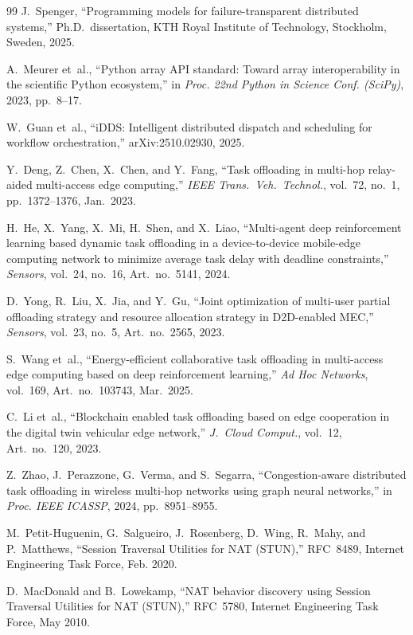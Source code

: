 {\begin{thebibliography}{99}
J.~Spenger,
``Programming models for failure-transparent distributed systems,''
Ph.D.\ dissertation, KTH Royal Institute of Technology, Stockholm, Sweden, 2025.

A.~Meurer et~al.,
``Python array API standard: Toward array interoperability in the scientific Python ecosystem,''
in \textit{Proc. 22nd Python in Science Conf. (SciPy)}, 2023, pp.~8--17.

W.~Guan et~al.,
``iDDS: Intelligent distributed dispatch and scheduling for workflow orchestration,''
arXiv:2510.02930, 2025.

Y.~Deng, Z.~Chen, X.~Chen, and Y.~Fang,
``Task offloading in multi-hop relay-aided multi-access edge computing,''
\textit{IEEE Trans.\ Veh.\ Technol.}, vol.~72, no.~1, pp.~1372--1376, Jan.\ 2023.

H.~He, X.~Yang, X.~Mi, H.~Shen, and X.~Liao,
``Multi-agent deep reinforcement learning based dynamic task offloading in a device-to-device mobile-edge computing network to minimize average task delay with deadline constraints,''
\textit{Sensors}, vol.~24, no.~16, Art.~no.~5141, 2024.

D.~Yong, R.~Liu, X.~Jia, and Y.~Gu,
``Joint optimization of multi-user partial offloading strategy and resource allocation strategy in D2D-enabled MEC,''
\textit{Sensors}, vol.~23, no.~5, Art.~no.~2565, 2023.

S.~Wang et~al.,
``Energy-efficient collaborative task offloading in multi-access edge computing based on deep reinforcement learning,''
\textit{Ad Hoc Networks}, vol.~169, Art.~no.~103743, Mar.\ 2025.

C.~Li et~al.,
``Blockchain enabled task offloading based on edge cooperation in the digital twin vehicular edge network,''
\textit{J.\ Cloud Comput.}, vol.~12, Art.~no.~120, 2023.

Z.~Zhao, J.~Perazzone, G.~Verma, and S.~Segarra,
``Congestion-aware distributed task offloading in wireless multi-hop networks using graph neural networks,''
in \textit{Proc. IEEE ICASSP}, 2024, pp.~8951--8955.

 M.~Petit-Huguenin, G.~Salgueiro, J.~Rosenberg, D.~Wing, R.~Mahy, and P.~Matthews, ``Session Traversal Utilities for NAT (STUN),'' RFC~8489, Internet Engineering Task Force, Feb. 2020.

 D.~MacDonald and B.~Lowekamp, ``NAT behavior discovery using Session Traversal Utilities for NAT (STUN),'' RFC~5780, Internet Engineering Task Force, May 2010.


\end{thebibliography}}

